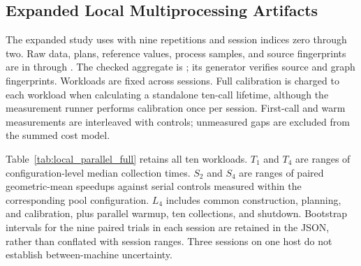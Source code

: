 \subsection{Expanded Local Multiprocessing Artifacts}
The expanded study uses  with nine repetitions and
session indices zero through two. Raw data, plans, reference values, process samples, and source
fingerprints are in  through
. The checked aggregate is
; its generator verifies source and graph
fingerprints. Workloads are fixed across sessions. Full calibration is charged to each workload
when calculating a standalone ten-call lifetime, although the measurement runner performs
calibration once per session. First-call and warm measurements are interleaved with controls;
unmeasured gaps are excluded from the summed cost model.

Table~\ref{tab:local_parallel_full} retains all ten workloads. $T_1$ and $T_4$ are ranges of
configuration-level median collection times. $S_2$ and $S_4$ are ranges of paired geometric-mean
speedups against serial controls measured within the corresponding pool configuration. $L_4$
includes common construction, planning, and calibration, plus parallel warmup, ten collections,
and shutdown. Bootstrap intervals for the nine paired trials in each session are retained in the
JSON, rather than conflated with session ranges. Three sessions on one host do not establish
between-machine uncertainty.

